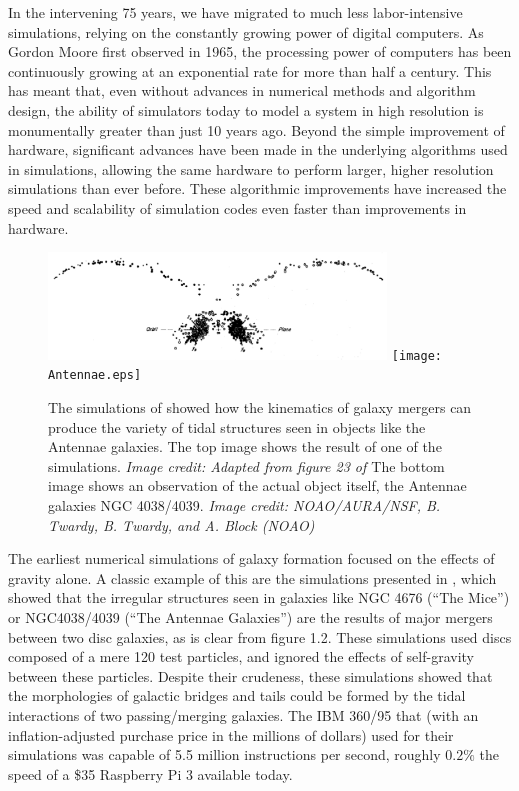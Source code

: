 In the intervening 75 years, we have migrated to much less labor-intensive
simulations, relying on the constantly growing power of digital computers.  As
Gordon Moore first observed in 1965, the processing power of computers has been
continuously growing at an exponential rate for more than half a century.  This
has meant that, even without advances in numerical methods and algorithm design,
the ability of simulators today to model a system in high resolution is
monumentally greater than just 10 years ago.  Beyond the simple improvement of
hardware, significant advances have been made in the underlying algorithms used
in simulations, allowing the same hardware to perform larger, higher resolution
simulations than ever before.  These algorithmic improvements have increased the
speed and scalability of simulation codes even faster than improvements in
hardware.

\begin{figure}
    \includegraphics[width=0.8\textwidth]{Toomre.eps}
    \texttt{[image: Antennae.eps]}
    \caption[Early simulation of Antennae Galaxies]{The simulations of
    \citet{Toomre1972} showed how the kinematics of galaxy mergers can produce
    the variety of tidal structures seen in objects like the Antennae galaxies.
    The top image shows the result of one of the \citet{Toomre1972} simulations.
    \textit{Image credit: Adapted from figure 23 of \citet{Toomre1972}}
    The bottom image shows an observation of the actual object itself, the
    Antennae galaxies NGC 4038/4039. \textit{Image credit: NOAO/AURA/NSF, B.
    Twardy, B. Twardy, and A. Block (NOAO)}}
\end{figure}

The earliest numerical simulations of galaxy formation focused on the effects of
gravity alone.  A classic example of this are the simulations presented in
\citet{Toomre1972}, which showed that the irregular structures seen in galaxies
like NGC 4676 (``The Mice'') or NGC4038/4039 (``The Antennae Galaxies'') are the
results of major mergers between two disc galaxies, as is clear from figure 1.2.
These simulations used discs composed of a mere 120 test particles, and ignored
the effects of self-gravity between these particles.  Despite their crudeness,
these simulations showed that the morphologies of galactic bridges and tails could be
formed by the tidal interactions of two passing/merging galaxies.  The IBM
360/95 that \citet{Toomre1972} (with an inflation-adjusted purchase price in the
millions of dollars) used for their simulations was capable of 5.5 million
instructions per second, roughly $0.2\%$ the speed of a \$35 Raspberry Pi 3
available today.

